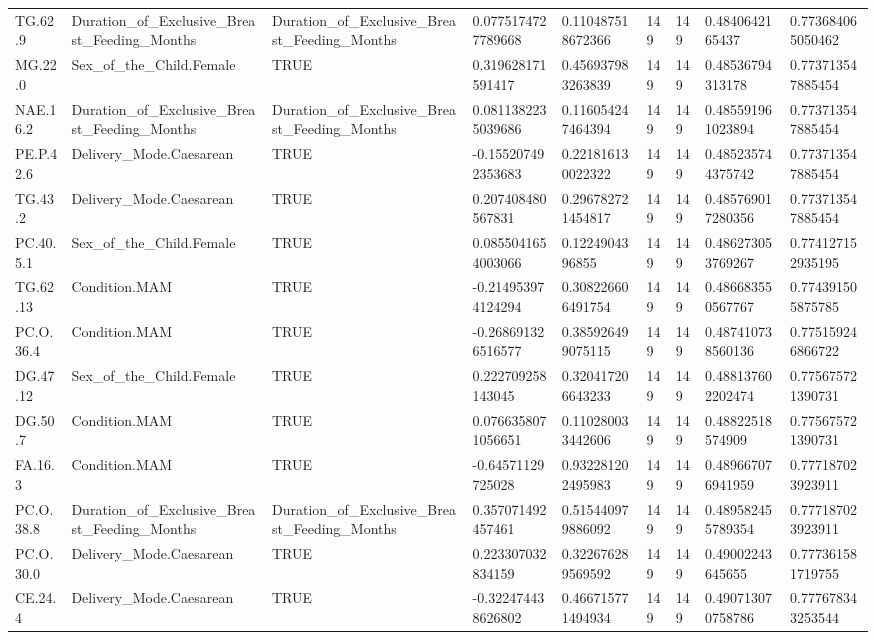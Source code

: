 \begin{longtable}{lllllllll}
TG.62.9 & Duration\_of\_Exclusive\_Breast\_Feeding\_Months & Duration\_of\_Exclusive\_Breast\_Feeding\_Months & 0.0775174727789668 & 0.110487518672366 & 149 & 149 & 0.4840642165437 & 0.773684065050462 \\
MG.22.0 & Sex\_of\_the\_Child.Female & TRUE & 0.319628171591417 & 0.456937983263839 & 149 & 149 & 0.48536794313178 & 0.773713547885454 \\
NAE.16.2 & Duration\_of\_Exclusive\_Breast\_Feeding\_Months & Duration\_of\_Exclusive\_Breast\_Feeding\_Months & 0.0811382235039686 & 0.116054247464394 & 149 & 149 & 0.485591961023894 & 0.773713547885454 \\
PE.P.42.6 & Delivery\_Mode.Caesarean & TRUE & -0.155207492353683 & 0.221816130022322 & 149 & 149 & 0.485235744375742 & 0.773713547885454 \\
TG.43.2 & Delivery\_Mode.Caesarean & TRUE & 0.207408480567831 & 0.296782721454817 & 149 & 149 & 0.485769017280356 & 0.773713547885454 \\
PC.40.5.1 & Sex\_of\_the\_Child.Female & TRUE & 0.0855041654003066 & 0.1224904396855 & 149 & 149 & 0.486273053769267 & 0.774127152935195 \\
TG.62.13 & Condition.MAM & TRUE & -0.214953974124294 & 0.308226606491754 & 149 & 149 & 0.486683550567767 & 0.774391505875785 \\
PC.O.36.4 & Condition.MAM & TRUE & -0.268691326516577 & 0.385926499075115 & 149 & 149 & 0.487410738560136 & 0.775159246866722 \\
DG.47.12 & Sex\_of\_the\_Child.Female & TRUE & 0.222709258143045 & 0.320417206643233 & 149 & 149 & 0.488137602202474 & 0.775675721390731 \\
DG.50.7 & Condition.MAM & TRUE & 0.0766358071056651 & 0.110280033442606 & 149 & 149 & 0.48822518574909 & 0.775675721390731 \\
FA.16.3 & Condition.MAM & TRUE & -0.64571129725028 & 0.932281202495983 & 149 & 149 & 0.489667076941959 & 0.777187023923911 \\
PC.O.38.8 & Duration\_of\_Exclusive\_Breast\_Feeding\_Months & Duration\_of\_Exclusive\_Breast\_Feeding\_Months & 0.357071492457461 & 0.515440979886092 & 149 & 149 & 0.489582455789354 & 0.777187023923911 \\
PC.O.30.0 & Delivery\_Mode.Caesarean & TRUE & 0.223307032834159 & 0.322676289569592 & 149 & 149 & 0.49002243645655 & 0.777361581719755 \\
CE.24.4 & Delivery\_Mode.Caesarean & TRUE & -0.322474438626802 & 0.466715771494934 & 149 & 149 & 0.490713070758786 & 0.777678343253544 \\

\end{longtable}

